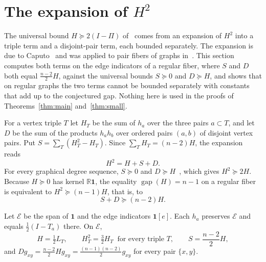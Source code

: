 \section{The expansion of \texorpdfstring{$H^2$}{H squared}}\label{exp:section}
The universal bound $H\succeq2(I-\Pi)$ of~\cite{S26} comes from an expansion
of $H^2$ into a triple term and a disjoint-pair term, each bounded
separately. The expansion is due to
Caputo~\cite[Equations~(1.13) to~(1.15)]{Caputo08} and was applied to pair
fibers of graphs in~\cite[Proposition~7.1]{OAI26}. This section computes both terms on the edge indicators of a
regular fiber, where $S$ and $D$ both equal $\tfrac{n-2}2H$, against the
universal bounds $S\succeq0$ and $D\succeq H$, and shows that
on regular graphs the two terms cannot be bounded separately with constants
that add up to the conjectured gap. Nothing here is used in the proofs of
Theorems~\ref{thm:main} and~\ref{thm:small}.

For a vertex triple $T$ let $H_T$ be the sum of $h_a$ over the three pairs
$a\subset T$, and let $D$ be the sum of the products $h_ah_b$ over ordered
pairs $(a,b)$ of disjoint vertex pairs. Put $S=\sum_T(H_T^2-H_T)$. Since
$\sum_TH_T=(n-2)H$, the expansion~\cite[Equation~(6.1)]{S26} reads
\begin{equation}\label{exp:expansion}
 H^2=H+S+D .
\end{equation}
For every graphical degree sequence, $S\succeq0$ and
$D\succeq H$~\cite[Lemma~A.4 and Proposition~6.1]{S26}, which gives
$H^2\succeq2H$. Because $H\succeq0$ has kernel $\mathbb R\mathbf1$, the
equality $\operatorname{gap}(H)=n-1$ on a regular fiber is equivalent to
$H^2\succeq(n-1)H$, that is, to
\begin{equation}\label{exp:target}
 S+D\succeq(n-2)H .
\end{equation}

\begin{proposition}\label{exp:edges}
Let $\mathcal E$ be the span of $\mathbf1$ and the edge indicators
$\mathbf1[e]$. Each $h_a$ preserves $\mathcal E$ and equals
$\tfrac12(I-T_a)$ there. On $\mathcal E$,
\[
 H=\tfrac12L_T,\qquad H_T^2=\tfrac32H_T\ \text{ for every triple }T,\qquad
 S=\frac{n-2}2H,
\]
and $Dg_{xy}=\tfrac{n-2}2Hg_{xy}=\tfrac{(n-1)(n-2)}2g_{xy}$ for every pair
$\{x,y\}$.
\end{proposition}

